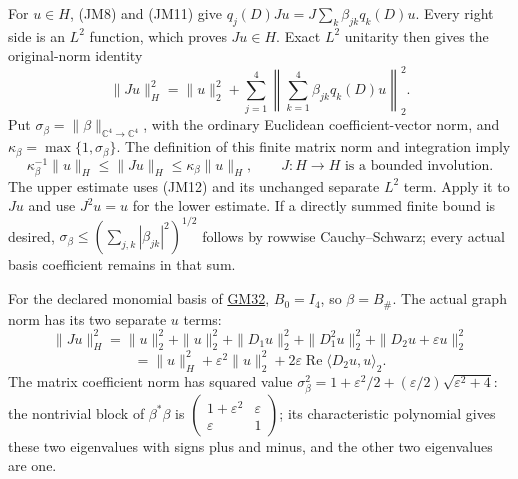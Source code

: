 \documentclass[
  11pt,
]{article}
\begin{document}
For \(u\in H\), (JM8) and (JM11) give
\(q_j(D)Ju=J\sum_k\beta_{jk}q_k(D)u\). Every right side is an \(L^2\)
function, which proves \(Ju\in H\). Exact
\(L^2\) unitarity then gives the original-norm identity
\[
 \|Ju\|_H^2
    =\|u\|_2^2
       +\sum_{j=1}^4
             \left\|\sum_{k=1}^4\beta_{jk}q_k(D)u\right\|_2^2.
 \tag{JM12}
\] Put \(\sigma_\beta=\|\beta\|_{\mathbb C^4\to\mathbb C^4}\), with the ordinary
Euclidean coefficient-vector norm, and \(\kappa_\beta=\max\{1,\sigma_\beta\}\). The
definition of this finite matrix norm and integration imply
\[
 \kappa_\beta^{-1}\|u\|_H
       \leq\|Ju\|_H\leq\kappa_\beta\|u\|_H,
 \qquad J:H\longrightarrow H\text{ is a bounded involution.}
 \tag{JM13}
\] The upper estimate uses (JM12) and its unchanged
separate \(L^2\) term. Apply it to
\(Ju\) and use \(J^2u=u\) for the lower
estimate. If a directly summed finite bound is desired,
\(\sigma_\beta\leq(\sum_{j,k}|\beta_{jk}|^2)^{1/2}\) follows by rowwise Cauchy--Schwarz; every actual
basis coefficient remains in that sum.

For the declared monomial basis of
\href{../u006-graph-domains/graph-domain-note.html\#eq-GM32}{GM32},
\(B_0=I_4\), so \(\beta=B_\#\). The actual graph
norm has its two separate \(u\) terms:
\[
 \|Ju\|_H^2
     =\|u\|_2^2+\|u\|_2^2+
          \|D_1u\|_2^2+\|D_1^2u\|_2^2+\|D_2u+\varepsilon u\|_2^2
\] \[
     =\|u\|_H^2+\varepsilon^2\|u\|_2^2
                    +2\varepsilon\operatorname{Re}\langle D_2u,u\rangle_2.
 \tag{JM14}
\] The matrix coefficient
norm has squared value \(\sigma_\beta^2=1+\varepsilon^2/2+
(\varepsilon/2)\sqrt{\varepsilon^2+4}\): the nontrivial block of
\(\beta^*\beta\) is \(\begin{pmatrix}1+\varepsilon^2&\varepsilon\\\varepsilon&1\end{pmatrix}\); its characteristic
polynomial gives these two eigenvalues with signs plus and minus, and
the other two eigenvalues are one.
\end{document}
